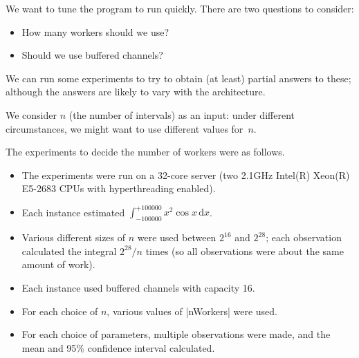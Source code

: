 \begin{slide}

We want to tune the program to run quickly.  There are two questions to
consider: 
%
\begin{itemize}
\item How many workers should we use?

\item Should we use buffered channels?
\end{itemize}
%
We can run some experiments to try to obtain (at least) partial answers to
these; although the answers are likely to vary with the architecture.

We consider $n$ (the number of intervals) as an input: under different
circumstances, we might want to use different values for~$n$.



\end{slide}


\begin{slide}

The experiments to decide the number of workers were as follows.
%
\begin{itemize}
\item The experiments were run on a 32-core server (two 2.1GHz Intel(R)
Xeon(R) E5-2683 CPUs with hyperthreading enabled).

\item 
Each instance estimated $\int_{-100000}^{+100000} x^2 \cos x \, \mbox{d}x$.

\item
Various different sizes of $n$ were used between $2^{16}$ and $2^{28}$; each
observation calculated the integral $2^{28}/n$ times (so all observations were
about the same amount of work).

\item
Each instance used buffered channels with capacity 16.

\item
For each choice of $n$, various values of |nWorkers| were used.

\item
For each choice of parameters, multiple observations were made, and the mean
and 95\% confidence interval calculated.
\end{itemize}
\end{slide}

